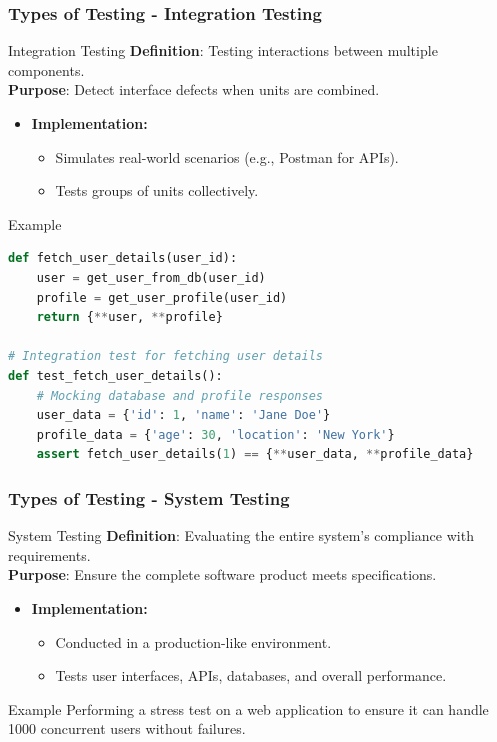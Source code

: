 \documentclass{beamer}
\begin{document}
\begin{frame}[fragile]
    \frametitle{Types of Testing - Integration Testing}
    \begin{block}{Integration Testing}
        \textbf{Definition}: Testing interactions between multiple components. \\
        \textbf{Purpose}: Detect interface defects when units are combined.
    \end{block}
    \begin{itemize}
        \item \textbf{Implementation:}
            \begin{itemize}
                \item Simulates real-world scenarios (e.g., Postman for APIs).
                \item Tests groups of units collectively. 
            \end{itemize}
    \end{itemize}
    \begin{block}{Example}
        \begin{lstlisting}[language=Python]
def fetch_user_details(user_id):
    user = get_user_from_db(user_id)
    profile = get_user_profile(user_id)
    return {**user, **profile}

# Integration test for fetching user details
def test_fetch_user_details():
    # Mocking database and profile responses
    user_data = {'id': 1, 'name': 'Jane Doe'}
    profile_data = {'age': 30, 'location': 'New York'}
    assert fetch_user_details(1) == {**user_data, **profile_data}
        \end{lstlisting}
    \end{block}
\end{frame}

\begin{frame}[fragile]
    \frametitle{Types of Testing - System Testing}
    \begin{block}{System Testing}
        \textbf{Definition}: Evaluating the entire system's compliance with requirements. \\
        \textbf{Purpose}: Ensure the complete software product meets specifications.
    \end{block}
    \begin{itemize}
        \item \textbf{Implementation:}
            \begin{itemize}
                \item Conducted in a production-like environment.
                \item Tests user interfaces, APIs, databases, and overall performance. 
            \end{itemize}
    \end{itemize}
    \begin{block}{Example}
        Performing a stress test on a web application to ensure it can handle 1000 concurrent users without failures.
    \end{block}
\end{frame}
\end{document}
